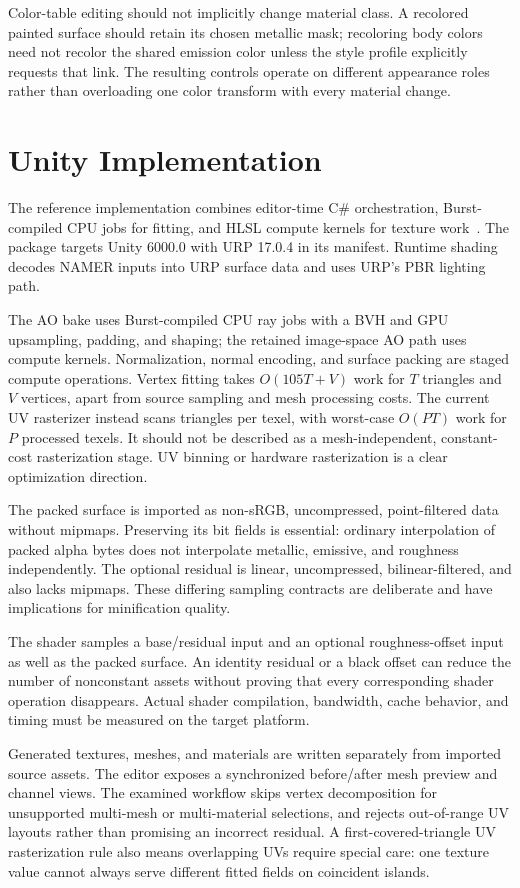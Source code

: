 \documentclass[11pt,letterpaper]{article}
\begin{document}
Color-table editing should not implicitly change material class. A recolored painted surface should retain its chosen metallic mask; recoloring body colors need not recolor the shared emission color unless the style profile explicitly requests that link. The resulting controls operate on different appearance roles rather than overloading one color transform with every material change.

\section{Unity Implementation}
The reference implementation combines editor-time C\# orchestration, Burst-compiled CPU jobs for fitting, and HLSL compute kernels for texture work~\cite{namer2026}. The package targets Unity 6000.0 with URP 17.0.4 in its manifest. Runtime shading decodes NAMER inputs into URP surface data and uses URP's PBR lighting path.

The AO bake uses Burst-compiled CPU ray jobs with a BVH and GPU upsampling, padding, and shaping; the retained image-space AO path uses compute kernels. Normalization, normal encoding, and surface packing are staged compute operations. Vertex fitting takes $O(105T+V)$ work for $T$ triangles and $V$ vertices, apart from source sampling and mesh processing costs. The current UV rasterizer instead scans triangles per texel, with worst-case $O(PT)$ work for $P$ processed texels. It should not be described as a mesh-independent, constant-cost rasterization stage. UV binning or hardware rasterization is a clear optimization direction.

The packed surface is imported as non-sRGB, uncompressed, point-filtered data without mipmaps. Preserving its bit fields is essential: ordinary interpolation of packed alpha bytes does not interpolate metallic, emissive, and roughness independently. The optional residual is linear, uncompressed, bilinear-filtered, and also lacks mipmaps. These differing sampling contracts are deliberate and have implications for minification quality.

The shader samples a base/residual input and an optional roughness-offset input as well as the packed surface. An identity residual or a black offset can reduce the number of nonconstant assets without proving that every corresponding shader operation disappears. Actual shader compilation, bandwidth, cache behavior, and timing must be measured on the target platform.

Generated textures, meshes, and materials are written separately from imported source assets. The editor exposes a synchronized before/after mesh preview and channel views. The examined workflow skips vertex decomposition for unsupported multi-mesh or multi-material selections, and rejects out-of-range UV layouts rather than promising an incorrect residual. A first-covered-triangle UV rasterization rule also means overlapping UVs require special care: one texture value cannot always serve different fitted fields on coincident islands.
\end{document}
